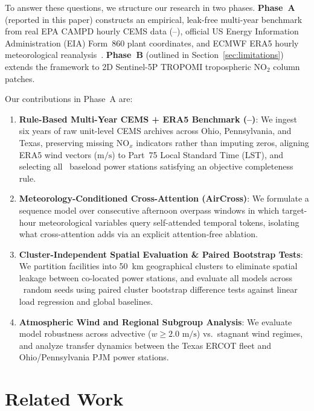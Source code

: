 \documentclass[conference]{IEEEtran}
\begin{document}
To answer these questions, we structure our research in two phases. \textbf{Phase~A} (reported in this paper) constructs an empirical, leak-free multi-year benchmark from real EPA CAMPD hourly CEMS data (\YearFirst--\YearLast), official US Energy Information Administration (EIA) Form~860 plant coordinates, and ECMWF ERA5 hourly meteorological reanalysis~\cite{hersbach2020era5}. \textbf{Phase~B} (outlined in Section~\ref{sec:limitations}) extends the framework to 2D Sentinel-5P TROPOMI tropospheric $\text{NO}_2$ column patches.

Our contributions in Phase~A are:
\begin{enumerate}
    \item \textbf{Rule-Based Multi-Year CEMS + ERA5 Benchmark (\YearFirst--\YearLast)}: We ingest six years of raw unit-level CEMS archives across Ohio, Pennsylvania, and Texas, preserving missing $\text{NO}_x$ indicators rather than imputing zeros, aligning ERA5 wind vectors ($\text{m/s}$) to Part~75 Local Standard Time (LST), and selecting all \NFacilities~baseload power stations satisfying an objective completeness rule.
    \item \textbf{Meteorology-Conditioned Cross-Attention (AirCross)}: We formulate a sequence model over consecutive afternoon overpass windows in which target-hour meteorological variables query self-attended temporal tokens, isolating what cross-attention adds via an explicit attention-free ablation.
    \item \textbf{Cluster-Independent Spatial Evaluation \& Paired Bootstrap Tests}: We partition facilities into 50~km geographical clusters to eliminate spatial leakage between co-located power stations, and evaluate all models across \NSeeds~random seeds using paired cluster bootstrap difference tests against linear load regression and global baselines.
    \item \textbf{Atmospheric Wind and Regional Subgroup Analysis}: We evaluate model robustness across advective ($w \ge 2.0\text{ m/s}$) vs.\ stagnant wind regimes, and analyze transfer dynamics between the Texas ERCOT fleet and Ohio/Pennsylvania PJM power stations.
\end{enumerate}

\section{Related Work}
\label{sec:related}
\end{document}

